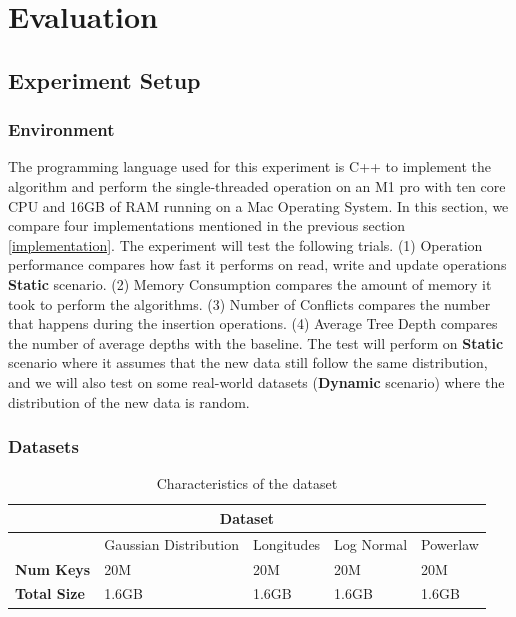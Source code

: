 
\chapter{Evaluation} \label{Evaluation}
\section{Experiment Setup}
\subsection{Environment}
The programming language used for this experiment is C++ to implement the algorithm and perform the single-threaded operation on an M1 pro with ten core CPU and 16GB of RAM running on a Mac Operating System. In this section, we compare four implementations mentioned in the previous section \ref{implementation}. 
The experiment will test the following trials. (1) Operation performance compares how fast it performs on read, write and update operations \textbf{Static} scenario. (2) Memory Consumption compares the amount of memory it took to perform the algorithms. (3) Number of Conflicts compares the number \conflict that happens during the insertion operations. (4) Average Tree Depth compares the number of average depths with the baseline. 
The test will perform on \textbf{Static} scenario where it assumes that the new data still follow the same distribution, and we will also test on some real-world datasets (\textbf{Dynamic} scenario) where the distribution of the new data is random. 
\subsection{Datasets}
\begin{table}
    \centering
    \begin{tabular}{ |p{2cm}|p{2cm}|p{2cm}|p{2cm}| p{2cm}|  } 
        
     \hline
     \multicolumn{5}{|c|}{Dataset} \\
     \hline
     & Gaussian Distribution & Longitudes & Log Normal & Powerlaw\\
     \hline
     \textbf{Num Keys} & 20M & 20M & 20M & 20M \\
     \textbf{Total Size} & 1.6GB & 1.6GB & 1.6GB & 1.6GB\\
     \hline
    
    \end{tabular}
     \caption{Characteristics of the dataset}
    \label{tab:characteristicdataset}
\end{table}
